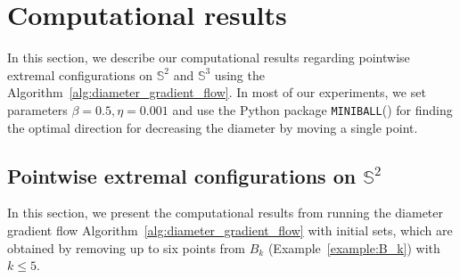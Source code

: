 \documentclass[12pt]{amsart}
\theoremstyle{plain}
\newcommand{\Sp}{\mathbb{S}}
\numberwithin{equation}{section}
\begin{document}
\section{Computational results}\label{sec:computational_results}

In this section, we describe our computational results regarding
pointwise extremal configurations on $\Sp^2$ and $\Sp^3$ using the
Algorithm~\ref{alg:diameter_gradient_flow}. In most of our
experiments, we set parameters $\beta = 0.5, \eta = 0.001$
and use the Python package
  \texttt{MINIBALL}(\cite{miniball}) for finding the optimal
  direction for decreasing the diameter by moving a single point.



\subsection{Pointwise extremal configurations on $\Sp^2$}\label{sec:exp_dim_two}

In this section, we present the computational results from running the
diameter gradient flow Algorithm~\ref{alg:diameter_gradient_flow} with
initial sets, which are obtained by removing up to six points from $B_k$ (Example~\ref{example:B_k}) with $k\leq 5$.
\end{document}
